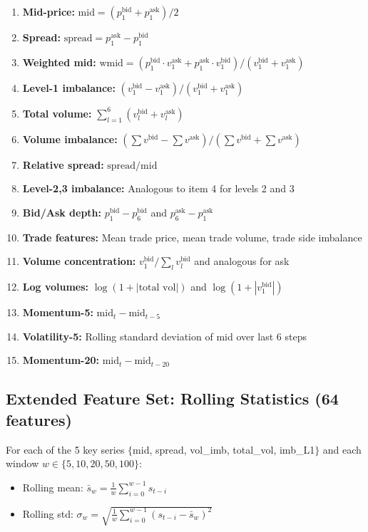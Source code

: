 \documentclass[11pt,a4paper]{article}
\begin{document}
\begin{enumerate}[itemsep=0.1em]
    \item \textbf{Mid-price:} $\text{mid} = (p_1^{\text{bid}} + p_1^{\text{ask}}) / 2$
    \item \textbf{Spread:} $\text{spread} = p_1^{\text{ask}} - p_1^{\text{bid}}$
    \item \textbf{Weighted mid:} $\text{wmid} = (p_1^{\text{bid}} \cdot v_1^{\text{ask}} + p_1^{\text{ask}} \cdot v_1^{\text{bid}}) / (v_1^{\text{bid}} + v_1^{\text{ask}})$
    \item \textbf{Level-1 imbalance:} $(v_1^{\text{bid}} - v_1^{\text{ask}}) / (v_1^{\text{bid}} + v_1^{\text{ask}})$
    \item \textbf{Total volume:} $\sum_{l=1}^{6}(v_l^{\text{bid}} + v_l^{\text{ask}})$
    \item \textbf{Volume imbalance:} $(\sum v^{\text{bid}} - \sum v^{\text{ask}}) / (\sum v^{\text{bid}} + \sum v^{\text{ask}})$
    \item \textbf{Relative spread:} $\text{spread} / \text{mid}$
    \item \textbf{Level-2,3 imbalance:} Analogous to item 4 for levels 2 and 3
    \item \textbf{Bid/Ask depth:} $p_1^{\text{bid}} - p_6^{\text{bid}}$ and $p_6^{\text{ask}} - p_1^{\text{ask}}$
    \item \textbf{Trade features:} Mean trade price, mean trade volume, trade side imbalance
    \item \textbf{Volume concentration:} $v_1^{\text{bid}} / \sum_{l} v_l^{\text{bid}}$ and analogous for ask
    \item \textbf{Log volumes:} $\log(1 + |\text{total vol}|)$ and $\log(1 + |v_1^{\text{bid}}|)$
    \item \textbf{Momentum-5:} $\text{mid}_t - \text{mid}_{t-5}$
    \item \textbf{Volatility-5:} Rolling standard deviation of mid over last 6 steps
    \item \textbf{Momentum-20:} $\text{mid}_t - \text{mid}_{t-20}$
\end{enumerate}


\subsection{Extended Feature Set: Rolling Statistics (64 features)}

For each of the 5 key series $\{$mid, spread, vol\_imb, total\_vol, imb\_L1$\}$ and each window $w \in \{5, 10, 20, 50, 100\}$:
\begin{itemize}[itemsep=0.1em]
    \item Rolling mean: $\bar{s}_w = \frac{1}{w}\sum_{i=0}^{w-1} s_{t-i}$
    \item Rolling std: $\sigma_w = \sqrt{\frac{1}{w}\sum_{i=0}^{w-1}(s_{t-i} - \bar{s}_w)^2}$
\end{itemize}
\end{document}
